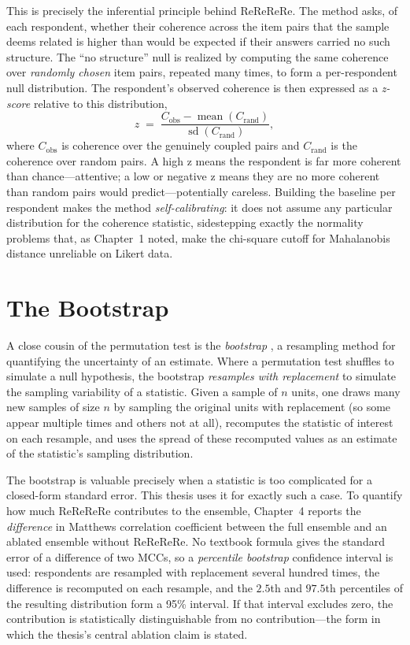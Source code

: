 This is precisely the inferential principle behind ReReReRe. The method asks, of
each respondent, whether their coherence across the item pairs that the sample
deems related is higher than would be expected if their answers carried no such
structure. The ``no structure'' null is realized by computing the same coherence
over \emph{randomly chosen} item pairs, repeated many times, to form a
per-respondent null distribution. The respondent's observed coherence is then
expressed as a \emph{z-score} relative to this distribution,
\begin{equation}
z \;=\; \frac{C_{\text{obs}} - \operatorname{mean}(C_{\text{rand}})}
{\operatorname{sd}(C_{\text{rand}})},
\label{eq:z}
\end{equation}
where $C_{\text{obs}}$ is coherence over the genuinely coupled pairs and
$C_{\text{rand}}$ is the coherence over random pairs. A high z means the
respondent is far more coherent than chance---attentive; a low or negative z
means they are no more coherent than random pairs would predict---potentially
careless. Building the baseline per respondent makes the method
\emph{self-calibrating}: it does not assume any particular distribution for the
coherence statistic, sidestepping exactly the normality problems that, as
Chapter~1 noted, make the chi-square cutoff for Mahalanobis distance unreliable
on Likert data.

\section{The Bootstrap}
\label{sec:boot}

A close cousin of the permutation test is the \emph{bootstrap}
\parencite{efron1979bootstrap, efron1993introduction}, a resampling method for
quantifying the uncertainty of an estimate. Where a permutation test shuffles to
simulate a null hypothesis, the bootstrap \emph{resamples with replacement} to
simulate the sampling variability of a statistic. Given a sample of $n$ units,
one draws many new samples of size $n$ by sampling the original units with
replacement (so some appear multiple times and others not at all), recomputes
the statistic of interest on each resample, and uses the spread of these
recomputed values as an estimate of the statistic's sampling distribution.

The bootstrap is valuable precisely when a statistic is too complicated for a
closed-form standard error. This thesis uses it for exactly such a case. To
quantify how much ReReReRe contributes to the ensemble, Chapter~4 reports the
\emph{difference} in Matthews correlation coefficient between the full ensemble
and an ablated ensemble without ReReReRe. No textbook formula gives the standard
error of a difference of two MCCs, so a \emph{percentile bootstrap} confidence
interval is used: respondents are resampled with replacement several hundred
times, the difference is recomputed on each resample, and the $2.5$th and
$97.5$th percentiles of the resulting distribution form a 95\% interval. If that
interval excludes zero, the contribution is statistically distinguishable from
no contribution---the form in which the thesis's central ablation claim is
stated.

